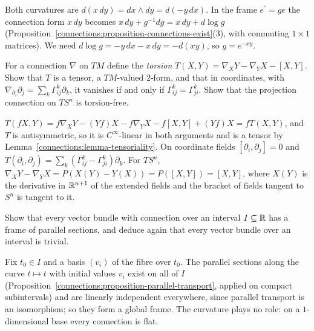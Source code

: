 \begin{solution}
Both curvatures are $d(x\,dy) = dx \wedge dy = d(-y\,dx)$. In the frame $e^{\prime} = ge$ the connection form $x\,dy$ becomes $x\,dy + g^{-1}dg = x\,dy + d\log g$
(Proposition~\ref{connections:proposition-connections-exist}(3), with commuting $1 \times 1$ matrices). We need $d\log g = -y\,dx - x\,dy = -d(xy)$, so $g = e^{-xy}$.
\end{solution}

\begin{exercise}\label{connections:exercise-torsion}
For a connection $\nabla$ on $TM$ define the \emph{torsion} $T(X, Y) = \nabla_XY - \nabla_YX - [X, Y]$. Show that $T$ is a tensor, a $TM$-valued $2$-form, and that in coordinates,
with $\nabla_{\partial_i}\partial_j = \sum_k\Gamma^k_{ij}\partial_k$, it vanishes if and only if $\Gamma^k_{ij} = \Gamma^k_{ji}$. Show that the projection connection on $TS^n$ is
torsion-free.
\end{exercise}

\begin{solution}
$T(fX, Y) = f\nabla_XY - (Yf)X - f\nabla_YX - f[X, Y] + (Yf)X = fT(X, Y)$, and $T$ is antisymmetric, so it is $C^\infty$-linear in both arguments and is a tensor by
Lemma~\ref{connections:lemma-tensoriality}. On coordinate fields $[\partial_i, \partial_j] = 0$ and $T(\partial_i, \partial_j) = \sum_k(\Gamma^k_{ij} - \Gamma^k_{ji})\partial_k$. For $TS^n$,
$\nabla_XY - \nabla_YX = P(X(Y) - Y(X)) = P([X, Y]) = [X, Y]$, where $X(Y)$ is the derivative in $\mathbb{R}^{n+1}$ of the extended fields and the bracket of fields tangent to $S^n$ is
tangent to it.
\end{solution}

\begin{exercise}\label{connections:exercise-connections-on-intervals}
Show that every vector bundle with connection over an interval $I \subseteq \mathbb{R}$ has a frame of parallel sections, and deduce again that every vector bundle over an interval
is trivial.
\end{exercise}

\begin{solution}
Fix $t_0 \in I$ and a basis $(v_i)$ of the fibre over $t_0$. The parallel sections along the curve $t \mapsto t$ with initial values $v_i$ exist on all of $I$
(Proposition~\ref{connections:proposition-parallel-transport}, applied on compact subintervals) and are linearly independent everywhere, since parallel transport is an isomorphism;
so they form a global frame. The curvature plays no role: on a $1$-dimensional base every connection is flat.
\end{solution}

